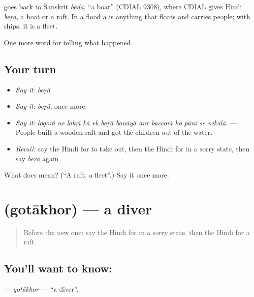 \begin{cousinweb}
goes back to Sanskrit \emph{bēḍā}, \textquotedblleft{}a boat\textquotedblright{} (CDIAL 9308), where CDIAL gives Hindi \emph{beṛā}, a boat or a raft. In a flood a \textbf{} is anything that floats and carries people; with ships, it is a fleet.
\end{cousinweb}

\begin{grammarlens}[title={What you've built}]
One more word for telling what happened.
\end{grammarlens}

\subsection*{Your turn}
\begin{itemize}
\raggedright
  \item \emph{Say it:} \emph{beṛā}
  \item \emph{Say it:} \emph{beṛā}, once more
  \item \emph{Say it:} \emph{logoṁ ne lakṛī kā ek beṛā banāyā aur baccoṁ ko pānī se nikālā.} — People built a wooden raft and got the children out of the water.
  \item \emph{Recall:} say the Hindi for to take out, then the Hindi for in a sorry state, then say \emph{beṛā} again
\end{itemize}

\begin{tcolorbox}[breakable,colback=teal!4,colframe=teal!35!black,title={Before you move on}]
What does  mean? (\textquotedblleft{}A raft; a fleet\textquotedblright{}.) Say it once more.
\end{tcolorbox}
\section[\texorpdfstring{\hi{गोताख़ोर} (gotākhor)}{गोताख़ोर (gotākhor)}]{ (gotākhor) — a diver}

\label{lesson:HI-C308-gotakhor}



\begin{quote}
Before the new one: say the Hindi for in a sorry state, then the Hindi for a raft.
\end{quote}

\subsection*{You'll want to know: }
\textbf{} — \emph{gotākhor} — \textquotedblleft{}a diver\textquotedblright{}.

